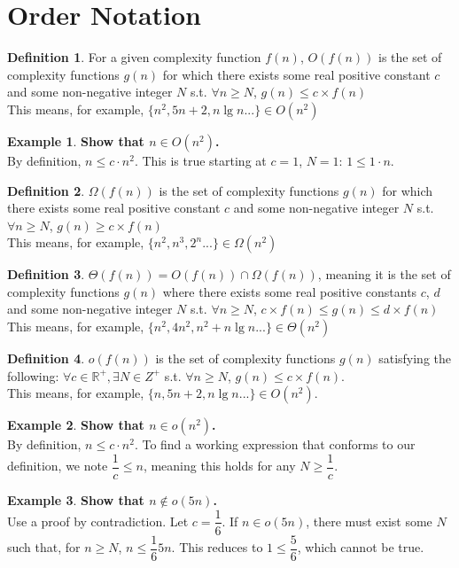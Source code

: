 \documentclass[aip, jmp, amsmath,amssymb, reprint]{revtex4-1}
\newcommand{\R}{\mathbb{R}}
\theoremstyle{definition}
\newtheorem{defn}{Definition}[section]
\newtheorem{exmp}{Example}[section]
\begin{document}
\section{Order Notation}
\begin{defn}
    For a given complexity function $f(n)$, $O(f(n))$ is the set of complexity functions $g(n)$ for which there exists some real positive constant $c$ and some non-negative integer $N$ s.t. $\forall n \geq N$, $g(n) \leq c \times f(n)$\\
    This means, for example, $\{n^2, 5n + 2, n\lg n ...\}\in O(n^2)$
\end{defn}
\begin{exmp}
\textbf{Show that $n \in O(n^2)$.}\\
By definition, $n \leq c\cdot n^2$. This is true starting at $c = 1$, $N = 1$: $1 \leq 1\cdot n$.
\end{exmp}
\begin{defn}
    $\Omega(f(n))$ is the set of complexity functions $g(n)$ for which there exists some real positive constant $c$ and some non-negative integer $N$ s.t. $\forall n \geq N$, $g(n) \geq c \times f(n)$\\
    This means, for example, $\{n^2, n^3, 2^n ...\}\in \Omega(n^2)$
\end{defn}
\begin{defn}
    $\Theta(f(n)) = O(f(n)) \cap \Omega(f(n))$, meaning it is the set of complexity functions $g(n)$ where there exists some real positive constants $c$, $d$ and some non-negative integer $N$ s.t. $\forall n \geq N$, $c\times f(n) \leq g(n) \leq d \times f(n)$\\
    This means, for example, $\{n^2, 4n^2, n^2 + n\lg n ...\}\in \Theta(n^2)$
\end{defn}
\begin{defn}
    $o(f(n))$ is the set of complexity functions $g(n)$ satisfying the following: $\forall c \in \R^+, \exists N \in Z^+$ s.t. $\forall n \geq N$, $g(n) \leq c \times f(n)$.\\
    This means, for example, $\{n, 5n + 2, n\lg n ...\}\in O(n^2)$.
\end{defn}
\begin{exmp}
\textbf{Show that $n \in o(n^2)$.}\\
By definition, $n \leq c\cdot n^2$. To find a working expression that conforms to our definition, we note $\dfrac{1}{c} \leq n$, meaning this holds for any $N \geq \dfrac{1}{c}$.
\end{exmp}
\begin{exmp}
\textbf{Show that $n \notin o(5n)$.}\\
Use a proof by contradiction. Let $c = \dfrac{1}{6}$. If $n \in o(5n)$, there must exist some $N$ such that, for $n \geq N$, $n \leq \dfrac{1}{6}5n$. This reduces to $1 \leq \dfrac{5}{6}$, which cannot be true.
\end{exmp}
\end{document}
